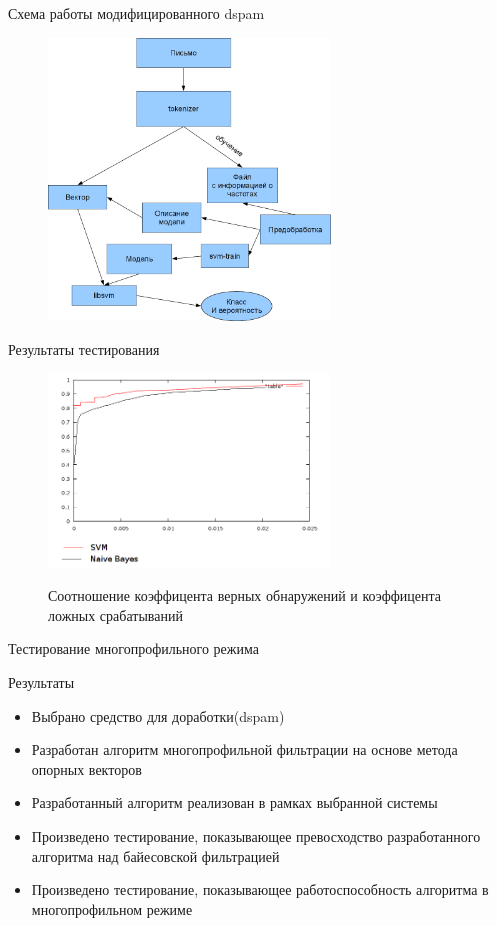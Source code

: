 \documentclass{beamer}
\begin{document}
\begin{frame}{Схема работы модифицированного dspam}
\begin{figure}[h]
\begin{center}
    \includegraphics[width=7.5cm]{../img/working_scheme}
\end{center}
\end{figure}
\end{frame}

\begin{frame}{Результаты тестирования}
\begin{figure}[h]
\begin{center}
    \includegraphics[width=7.5cm]{img/graphic}
\end{center}
    Соотношение коэффицента верных обнаружений и коэффицента ложных срабатываний
\end{figure}

\end{frame}

\begin{frame}{Тестирование многопрофильного режима}
\end{frame}

\begin{frame}{Результаты}
\begin{itemize}
    \item Выбрано средство для доработки(dspam)
    \item Разработан алгоритм многопрофильной фильтрации на основе метода опорных векторов
    \item Разработанный алгоритм реализован в рамках выбранной системы
    \item Произведено тестирование, показывающее превосходство разработанного алгоритма над байесовской фильтрацией
    \item Произведено тестирование, показывающее работоспособность алгоритма в многопрофильном режиме
\end{itemize}
\end{frame}




\begin{frame}
\end{frame}
\end{document}
